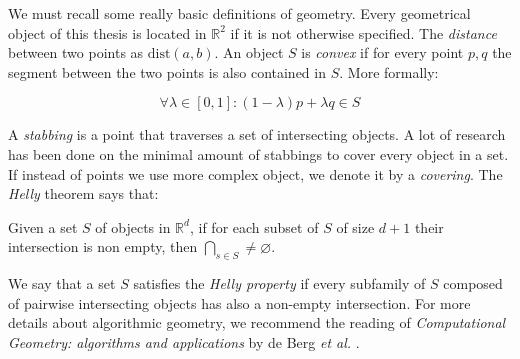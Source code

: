 We must recall some really basic definitions of geometry. Every geometrical object of this thesis is located in $\mathbb{R}^2$ if it is not otherwise specified. The \emph{distance} between two points as $\text{dist}(a,b)$. An object $S$ is \emph{convex} if for every point $p,q$ the segment between the two points is also contained in $S$. More formally:

$$\forall \lambda \in [0,1]: (1-\lambda)p + \lambda q \in S$$

A \emph{stabbing} is a point that traverses a set of intersecting objects. A lot of research has been done \cite{schlipf2013stabbing} on the minimal amount of stabbings to cover every object in a set. If instead of points we use more complex object, we denote it by a \emph{covering}. The \emph{Helly} theorem says that:

\begin{_theo}
  Given a set $S$ of objects in $\mathbb{R}^d$, if for each subset of $S$ of
  size $d+1$ their intersection is non empty, then $\bigcap_{s \in S} \neq
  \varnothing$.
\end{_theo}

We say that a set $S$ satisfies the \emph{Helly property} if every subfamily of $S$ composed of pairwise intersecting objects has also a non-empty intersection. For more details about algorithmic geometry, we recommend the reading of \textit{Computational Geometry: algorithms and applications} by de Berg \textit{et al.} \cite{bergComputationalGeometryAlgorithms2008}.
